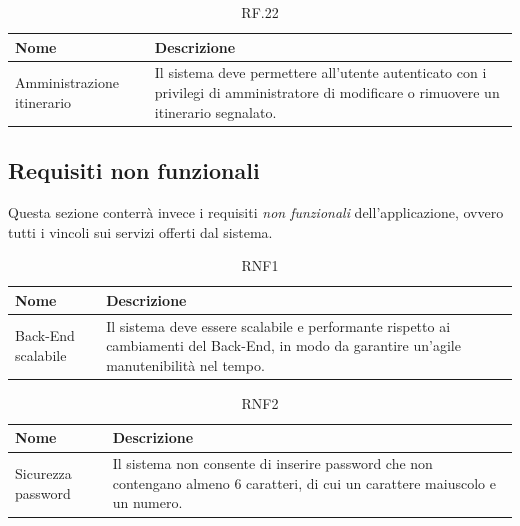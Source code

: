 \documentclass{natourDoc}
\begin{document}
\begin{table}[H]
	\centering
	\begin{tabular}{ |p{5cm}|p{10.3cm}| }
		\hline
		\rowcolor{PineGreen!70}
		\textbf{Nome}              & \textbf{Descrizione}                                                                                \\
		\hline
		Amministrazione itinerario & Il sistema deve permettere all'utente autenticato con i privilegi di amministratore di modificare o
		rimuovere un itinerario segnalato.                                                                                               \\
		\hline
	\end{tabular}
	\caption{RF.22}
	\label{table:22}
\end{table}

\subsection{Requisiti non funzionali}
Questa sezione conterrà invece i requisiti \textit{non funzionali} dell'applicazione, ovvero tutti i vincoli sui servizi offerti dal sistema.

\begin{table}[H]
	\centering
	\begin{tabular}{ |p{5cm}|p{10.3cm}| }
		\hline
		\rowcolor{PineGreen!70}
		\textbf{Nome}      & \textbf{Descrizione}                                                                 \\
		\hline
		Back-End scalabile & Il sistema deve essere scalabile e performante rispetto ai cambiamenti del Back-End,
		in modo da garantire un'agile manutenibilità nel tempo.                                                   \\
		\hline
	\end{tabular}
	\caption{RNF1}
	\label{table:22}
\end{table}

\begin{table}[H]
	\centering
	\begin{tabular}{ |p{5cm}|p{10.3cm}| }
		\hline
		\rowcolor{PineGreen!70}
		\textbf{Nome}      & \textbf{Descrizione}                                            \\
		\hline
		Sicurezza password & Il sistema non consente di inserire password che non contengano
		almeno 6 caratteri, di cui un carattere maiuscolo e un numero.                       \\
		\hline
	\end{tabular}
	\caption{RNF2}
	\label{table:24}
\end{table}
\end{document}
